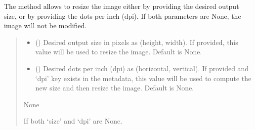 \documentclass[letterpaper,10pt,english]{sphinxmanual}
\begin{document}
\begin{fulllineitems}
\begin{fulllineitems}
\sphinxAtStartPar
The method allows to resize the image either by providing the desired
output size, or by providing the dots per inch (dpi). If both parameters
are None, the image will not be modified.
\begin{quote}\begin{description}
\begin{itemize}
\item {} 
\sphinxAtStartPar
{} (\sphinxstyleliteralemphasis{\sphinxupquote{, }}) \textendash{} Desired output size in pixels as (height, width). If provided, this
value will be used to resize the image. Default is None.

\item {} 
\sphinxAtStartPar
{} (\sphinxstyleliteralemphasis{\sphinxupquote{, }}) \textendash{} Desired dots per inch (dpi) as (horizontal, vertical). If provided and
‘dpi’ key exists in the metadata, this value will be used to compute
the new size and then resize the image. Default is None.

\end{itemize}

\sphinxAtStartPar
None

\sphinxAtStartPar
{} \textendash{} If both ‘size’ and ‘dpi’ are None.

\end{description}\end{quote}

\end{fulllineitems}



\end{fulllineitems}
\end{document}
